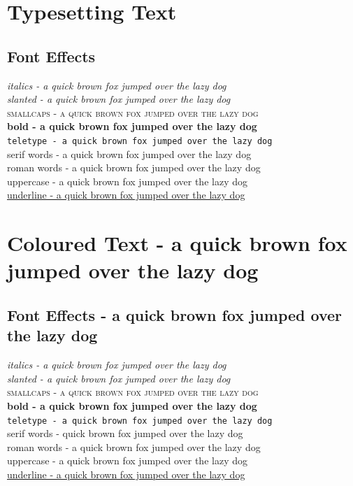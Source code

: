 \documentclass[a4paper, 12pt]{article}
\begin{document}
\section{Typesetting Text}
\subsection{Font Effects}
\textit{italics - a quick brown fox jumped over the lazy dog} \\
\textsl{slanted - a quick brown fox jumped over the lazy dog} \\
\textsc{smallcaps - a quick brown fox jumped over the lazy dog} \\
\textbf{bold - a quick brown fox jumped over the lazy dog} \\
\texttt{teletype - a quick brown fox jumped over the lazy dog} \\
\textsf{serif words - a quick brown fox jumped over the lazy dog} \\
\textrm{roman words - a quick brown fox jumped over the lazy dog} \\
\textup{uppercase - a quick brown fox jumped over the lazy dog} \\
\underline{underline - a quick brown fox jumped over the lazy dog}

\pagebreak
\pagecolor{black}
\color{white}

\section{Coloured Text - a quick brown fox jumped over the lazy dog}
\subsection{Font Effects - a quick brown fox jumped over the lazy dog}
\textit{italics - {\color{red}a quick brown fox jumped over the lazy dog}} \\
\textsl{slanted - {\color{green}a quick brown fox jumped over the lazy dog}} \\
\textsc{smallcaps - {\color{blue}a quick brown fox jumped over the lazy dog}} \\
\textbf{bold - {\color{yellow}a quick brown fox jumped over the lazy dog}} \\
\texttt{teletype - {\color{cyan}a quick brown fox jumped over the lazy dog}} \\
\textsf{serif words - {\color{magenta} quick brown fox jumped over the lazy dog}} \\
\textrm{roman words - a quick brown fox jumped over the lazy dog} \\
\textup{uppercase - a quick brown fox jumped over the lazy dog} \\
\underline{underline - a quick brown fox jumped over the lazy dog}
\end{document}
